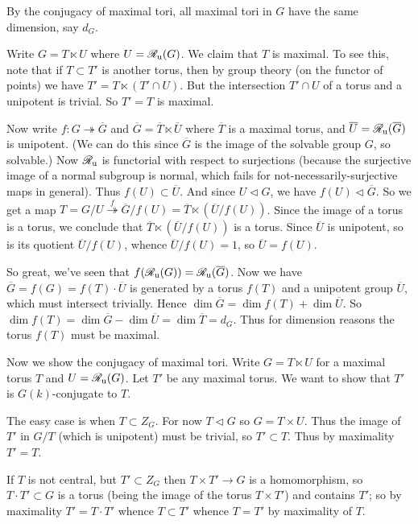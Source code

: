 \documentclass[10pt]{article}
\renewcommand{\(}{\left(}
\renewcommand{\)}{\right)}
\numberwithin{thm}{subsection}
\begin{document}
By the conjugacy of maximal tori, all maximal tori in $G$
have the same dimension, say $d_G$.

Write $G=T\ltimes U$ where $U=\mathscr{R}_{\rm{u}}(G)$.
We claim that $T$ is maximal.
To see this, note that if $T\subset T'$ is another torus,
then by group theory (on the functor of points)
we have $T'=T\ltimes (T'\cap U)$.
But the intersection $T'\cap U$ of a torus
and a unipotent is trivial.
So $T'=T$ is maximal.

Now write $f:G\twoheadrightarrow\overline{G}$
and $\overline{G}=\overline{T}\ltimes \overline{U}$
where $\overline{T}$ is a maximal torus,
and $\overline{U}=\mathscr{R}_{\rm{u}}(\overline{G})$ is unipotent.
(We can do this since $\overline{G}$ is the image of the solvable group $G$,
so solvable.)
Now $\mathscr{R}_{\rm{u}}$ is functorial with respect to surjections
(because the surjective image of a normal subgroup is normal,
which fails for not-necessarily-surjective maps in general).
Thus $f(U)\subset \overline{U}$.
And since $U\vartriangleleft G$, we have $f(U)\vartriangleleft\overline{G}$.
So we get a map $T=G/U\stackrel{f}{\twoheadrightarrow}\overline{G}/f(U)
=\overline{T}\ltimes (\overline{U}/f(U))$.
Since the image of a torus is a torus, we conclude
that $\overline{T}\ltimes (\overline{U}/f(U))$ is a torus.
Since $\overline{U}$ is unipotent,
so is its quotient $\overline{U}/f(U)$,
whence $\overline{U}/f(U)=1$,
so $\overline{U}=f(U)$.

So great, we've seen that $f(\mathscr{R}_{\rm{u}}(G))=\mathscr{R}_{\rm{u}}(\overline{G})$.
Now we have $\overline{G}=f(G)=f(T)\cdot \overline{U}$
is generated by a torus $f(T)$ and a unipotent group $\overline{U}$,
which must intersect trivially.
Hence $\dim \overline{G}=\dim f(T)+\dim \overline{U}$.
So $\dim f(T)=\dim \overline{G}-\dim \overline{U}=\dim \overline{T}=d_{\overline{G}}$. Thus for dimension reasons the torus $f(T)$ must be maximal.


Now we show the conjugacy of maximal tori.
Write $G=T\ltimes U$
for a maximal torus $T$
and $U=\mathscr{R}_{\rm{u}}(G)$.
Let $T'$ be any maximal torus.
We want to show that $T'$ is $G(k)$-conjugate to $T$.

The easy case is when $T\subset Z_G$.
For now $T\vartriangleleft G$
so $G=T\times U$.
Thus the image of $T'$ in $G/T$ (which is unipotent)
must be trivial,
so $T'\subset T$. Thus by maximality $T'=T$.

If $T$ is not central,
but   $T'\subset Z_G$
then $T\times T'\rightarrow G$
is a homomorphism,
so $T\cdot T'\subset G$ is a torus (being the image of the torus
$T\times T'$)
and contains $T'$;
so by maximality $T'=T\cdot T'$
whence $T\subset T'$ whence $T=T'$ by maximality of $T$.
\end{document}
